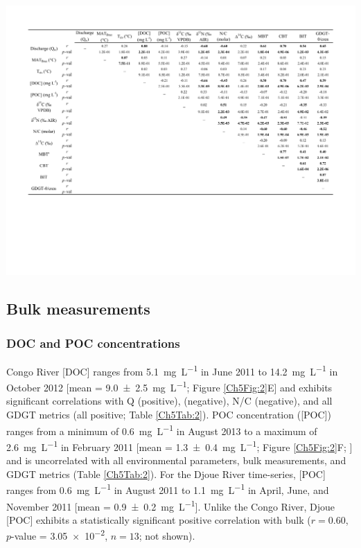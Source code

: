 \begin{table}
	\caption[Environmental parameter, POM, and GDGT correlation coefficients]{Matrix of correlation coefficients ($r$) and significance $p$-values for Congo River environmental parameters, POM composition, and GDGT distribution metrics. Statistically significant ($p$-value \num{\leq 0.05}) correlations are in bold.}
	\centering
		\includegraphics{Thesis_Tables/Ch5Tab2}
	\label{Ch5Tab:2} 
\end{table}

\subsection{Bulk measurements}

\subsubsection{DOC and POC concentrations}

Congo River [DOC] ranges from \SI{5.1}{mg.L^{-1}} in June 2011 to \SI{14.2}{mg.L^{-1}} in October 2012 [mean = \SI{9.0 \pm 2.5}{mg.L^{-1}}; Figure \ref{Ch5Fig:2}E] and exhibits significant correlations with Q (positive),  (negative), N/C (negative), and all GDGT metrics (all positive; Table \ref{Ch5Tab:2}). POC concentration ([POC]) ranges from a minimum of \SI{0.6}{mg.L^{-1}} in August 2013 to a maximum of \SI{2.6}{mg.L^{-1}} in February 2011 [mean = \SI{1.3 \pm 0.4}{mg.L^{-1}}; Figure \ref{Ch5Fig:2}F; \citealp{Hemingway:2016bq}] and is uncorrelated with all environmental parameters, bulk measurements, and GDGT metrics (Table \ref{Ch5Tab:2}). For the Djoue River time-series, [POC] ranges from \SI{0.6}{mg.L^{-1}} in August 2011 to \SI{1.1}{mg.L^{-1}} in April, June, and November 2011 [mean = \SI{0.9 \pm 0.2}{mg.L^{-1}}]. Unlike the Congo River, Djoue [POC] exhibits a statistically significant positive correlation with bulk  ($r = 0.60$, $p$-value = \num{3.05e-2}, $n = 13$; not shown).

